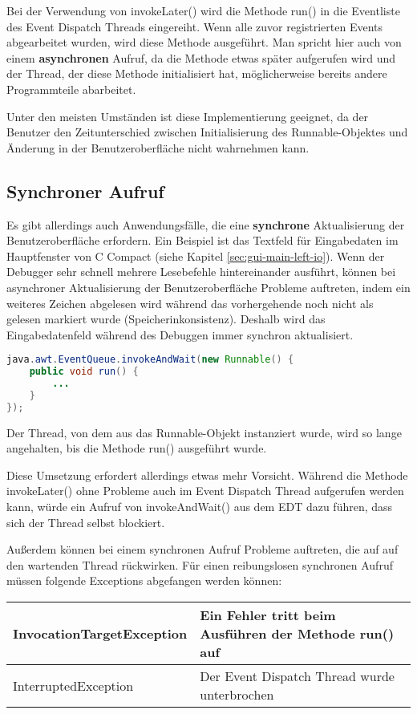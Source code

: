 	Bei der Verwendung von invokeLater() wird die Methode run() in die Eventliste des Event Dispatch Threads eingereiht. Wenn alle zuvor registrierten Events abgearbeitet wurden, wird diese Methode ausgeführt. Man spricht hier auch von einem \textbf{asynchronen} Aufruf, da die Methode etwas später aufgerufen wird und der Thread, der diese Methode initialisiert hat, möglicherweise bereits andere Programmteile abarbeitet.
	
	Unter den meisten Umständen ist diese Implementierung geeignet, da der Benutzer den Zeitunterschied zwischen Initialisierung des Runnable-Objektes und Änderung in der Benutzeroberfläche nicht wahrnehmen kann. 
	
\subsection*{Synchroner Aufruf}
Es gibt allerdings auch Anwendungsfälle, die eine \textbf{synchrone} Aktualisierung der Benutzeroberfläche erfordern. Ein Beispiel ist das Textfeld für Eingabedaten im Hauptfenster von C Compact (siehe Kapitel \ref{sec:gui-main-left-io}). Wenn der Debugger sehr schnell mehrere Lesebefehle hintereinander ausführt, können bei asynchroner Aktualisierung der Benutzeroberfläche Probleme auftreten, indem ein weiteres Zeichen abgelesen wird während das vorhergehende noch nicht als gelesen markiert wurde (Speicherinkonsistenz). Deshalb wird das Eingabedatenfeld während des Debuggen immer synchron aktualisiert.
\begin{lstlisting}[language=JAVA]
java.awt.EventQueue.invokeAndWait(new Runnable() {
	public void run() {
		...
	}
});
\end{lstlisting}
	Der Thread, von dem aus das Runnable-Objekt instanziert wurde, wird so lange angehalten, bis die Methode run() ausgeführt wurde.

	Diese Umsetzung erfordert allerdings etwas mehr Vorsicht. Während die Methode invokeLater() ohne Probleme auch im Event Dispatch Thread aufgerufen werden kann, würde ein Aufruf von invokeAndWait() aus dem EDT dazu führen, dass sich der Thread selbst blockiert.
	
	Außerdem können bei einem synchronen Aufruf Probleme auftreten, die auf auf den wartenden Thread rückwirken. Für einen reibungslosen synchronen Aufruf müssen folgende Exceptions abgefangen werden können:

\def\arraystretch{2.1}
\begin{tabular}{|l|l|}
	\hline
	InvocationTargetException & \parbox{7cm}{Ein Fehler tritt beim Ausführen der Methode run() auf}\\
	\hline
	InterruptedException & \parbox{7cm}{Der Event Dispatch Thread wurde unterbrochen}\\
	\hline
\end{tabular}


